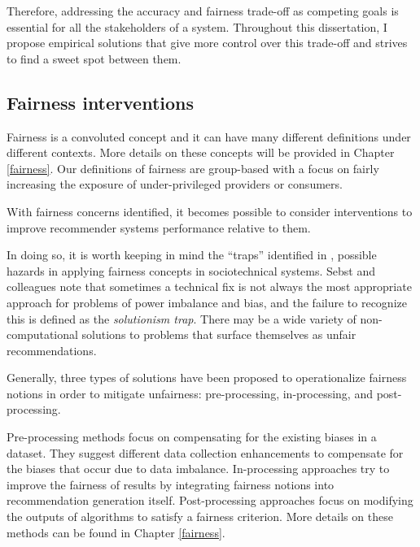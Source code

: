 



Therefore, addressing the accuracy and fairness trade-off as competing goals is essential for all the stakeholders of a system. Throughout this dissertation, I propose empirical solutions that give more control over this trade-off and strives to find a sweet spot between them. 


\subsection{Fairness interventions}

Fairness is a convoluted concept and it can have many different definitions under different contexts. More details on these concepts will be provided in Chapter \ref{fairness}. Our definitions of fairness are group-based with a focus on fairly increasing the exposure of under-privileged providers or consumers. 

With fairness concerns identified, it becomes possible to consider interventions to improve recommender systems performance relative to them. 

In doing so, it is worth keeping in mind the ``traps'' identified in \cite{selbst2019fairness}, possible hazards in applying fairness concepts in sociotechnical systems. Sebst and colleagues note that sometimes a technical fix is not always the most appropriate approach for problems of power imbalance and bias, and the failure to recognize this is defined as the \textit{solutionism trap}. There may be a wide variety of non-computational solutions to problems that surface themselves as unfair recommendations. 

Generally, three types of solutions have been proposed to operationalize fairness notions in order to mitigate  unfairness: pre-processing, in-processing, and post-processing.

Pre-processing methods focus on compensating for the existing biases in a dataset. They suggest different data collection enhancements to compensate for the biases that occur due to data imbalance. In-processing approaches try to improve the fairness of results by integrating fairness notions into recommendation generation itself. Post-processing approaches focus on modifying the outputs of algorithms to satisfy a fairness criterion. More details on these methods can be found in Chapter \ref{fairness}.


